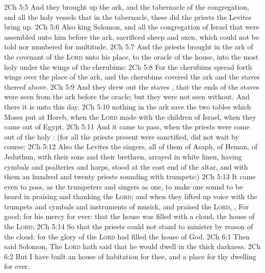 \vs 2Ch 5:5 And they brought up the ark, and the tabernacle of the congregation, and all the holy vessels that  in the tabernacle, these did the priests  the Levites bring up.
\vs 2Ch 5:6 Also king Solomon, and all the congregation of Israel that were assembled unto him before the ark, sacrificed sheep and oxen, which could not be told nor numbered for multitude.
\vs 2Ch 5:7 And the priests brought in the ark of the covenant of the \textsc{Lord} unto his place, to the oracle of the house, into the most holy  under the wings of the cherubims:
\vs 2Ch 5:8 For the cherubims spread forth  wings over the place of the ark, and the cherubims covered the ark and the staves thereof above.
\vs 2Ch 5:9 And they drew out the staves , that the ends of the staves were seen from the ark before the oracle; but they were not seen without. And there it is unto this day.
\vs 2Ch 5:10  nothing in the ark save the two tables which Moses put  at Horeb, when the \textsc{Lord} made  with the children of Israel, when they came out of Egypt.
\vs 2Ch 5:11 And it came to pass, when the priests were come out of the holy : (for all the priests  present were sanctified,  did not  wait by course:
\vs 2Ch 5:12 Also the Levites  the singers, all of them of Asaph, of Heman, of Jeduthun, with their sons and their brethren,  arrayed in white linen, having cymbals and psalteries and harps, stood at the east end of the altar, and with them an hundred and twenty priests sounding with trumpets:)
\vs 2Ch 5:13 It came even to pass, as the trumpeters and singers  as one, to make one sound to be heard in praising and thanking the \textsc{Lord}; and when they lifted up  voice with the trumpets and cymbals and instruments of musick, and praised the \textsc{Lord}, , For  good; for his mercy  for ever: that  the house was filled with a cloud,  the house of the \textsc{Lord};
\vs 2Ch 5:14 So that the priests could not stand to minister by reason of the cloud: for the glory of the \textsc{Lord} had filled the house of God.
\vs 2Ch 6:1 Then said Solomon, The \textsc{Lord} hath said that he would dwell in the thick darkness.
\vs 2Ch 6:2 But I have built an house of habitation for thee, and a place for thy dwelling for ever.
